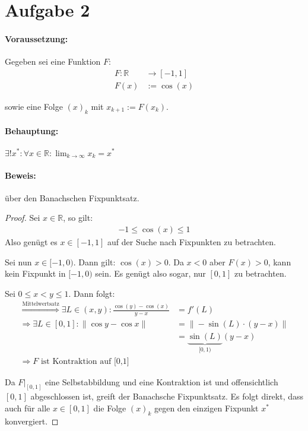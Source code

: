 \section*{Aufgabe 2}

\paragraph{Voraussetzung:} 
Gegeben sei eine Funktion $F$:
\begin{align*}
    F: \mathbb{R} &\rightarrow [-1, 1]\\
    F(x) &:= \cos(x)
\end{align*}

sowie eine Folge $(x)_k$ mit $x_{k+1} := F(x_k)$.

\paragraph{Behauptung:} $\displaystyle \exists! x^*: \forall x \in \mathbb{R}: \lim_{k \rightarrow \infty} x_k = x^*$

\paragraph{Beweis:} über den Banachschen Fixpunktsatz.
\begin{proof}
Sei $ x \in \mathbb{R}$, so gilt:
\begin{align*}
	-1 \leq \cos(x) \leq 1
\end{align*}
Also genügt es $x \in [-1, 1]$ auf der Suche nach Fixpunkten zu betrachten.

Sei nun $x \in [-1, 0)$. Dann gilt: $\cos(x) > 0$. Da $x <0$ aber $F(x) > 0$,
kann kein Fixpunkt in $[-1, 0)$ sein. Es genügt also sogar,
nur $[0, 1]$ zu betrachten.

Sei $0 \leq x < y \leq 1$. Dann folgt:
\begin{align}
    \stackrel{\text{Mittelwertsatz}}{\Rightarrow} \exists L \in (x,y): \frac{\cos(y) - \cos(x)}{y-x} &= f'(L)\\
    \Rightarrow \exists L \in [0,1]: \| \cos y - \cos x \| &= \| - \sin(L) \cdot (y-x)\| \\
    &= \underbrace{\sin(L)}_{[0,1)} (y-x)\\
   \Rightarrow F \text{ ist Kontraktion auf [0,1]}
\end{align}

Da $F|_{[0,1]}$ eine Selbstabbildung und eine Kontraktion ist und
offensichtlich $[0,1]$ abgeschlossen ist, greift der 
Banachsche Fixpunktsatz. Es folgt direkt, dass auch für alle $x \in [0,1]$
die Folge $(x)_k$ gegen den einzigen Fixpunkt $x^*$ konvergiert.
\end{proof}

